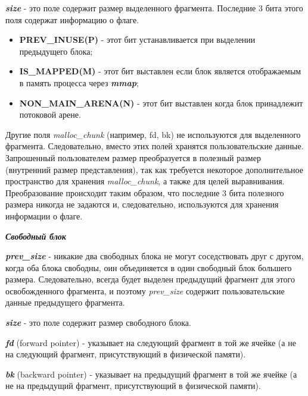 \textit{\textbf{size}} - это поле содержит размер выделенного фрагмента. Последние 3 бита этого поля содержат информацию о флаге.
\begin{itemize}
	\item \textbf{PREV\_INUSE(P)} - этот бит устанавливается при выделении предыдущего блока;
	\item \textbf{IS\_MAPPED(M)} - этот бит выставлен если блок является отображаемым в память процесса через \textbf{\textit{mmap}};
	\item \textbf{NON\_MAIN\_ARENA(N)} - этот бит выставлен когда блок принадлежит потоковой арене.
\end{itemize}
Другие поля \textit{malloc\_chunk} (например, fd, bk) не используются для выделенного фрагмента. Следовательно, вместо этих полей хранятся пользовательские данные. Запрошенный пользователем размер преобразуется в полезный размер (внутренний размер представления), так как требуется некоторое дополнительное пространство для хранения \textit{malloc\_chunk}, а также для целей выравнивания. Преобразование происходит таким образом, что последние 3 бита полезного размера никогда не задаются и, следовательно, используются для хранения информации о флаге.

\bigbreak
\textit{\textbf{Свободный блок}}

\textit{\textbf{prev\_size}} - никакие два свободных блока не могут соседствовать друг с другом, когда оба блока свободны, оин объединяется в один свободный блок большего размера. Следовательно, всегда будет выделен предыдущий фрагмент для этого освобожденного фрагмента, и поэтому \textit{prev\_size} содержит пользовательские данные предыдущего фрагмента.

\textit{\textbf{size}} - это поле содержит размер свободного блока.

\textit{\textbf{fd}} (forward pointer) - указывает на следующий фрагмент в той же ячейке (а не на следующий фрагмент, присутствующий в физической памяти).

\textit{\textbf{bk}} (backward pointer) - указывает на предыдущий фрагмент в той же ячейке (а не на предыдущий фрагмент, присутствующий в физической памяти).

